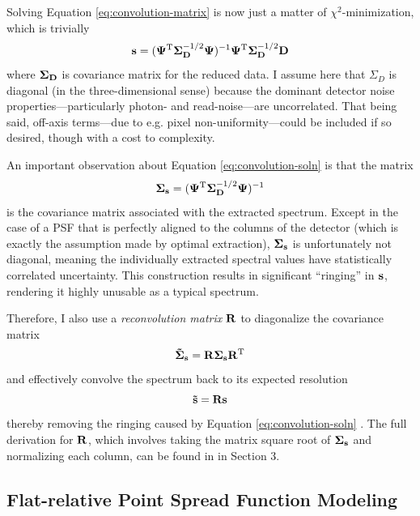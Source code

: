 Solving Equation \ref{eq:convolution-matrix} is now just a matter of $\chi^2$-minimization, which is trivially
\begin{equation}
    \vb{s} = (\vb{\Psi}^\mathrm{T} \vb{\Sigma}_{\vb{D}}^{-1/2} \vb{\Psi})^{-1} \vb{\Psi}^\mathrm{T} \vb{\Sigma}_{\vb{D}}^{-1/2} \vb{D}
    \label{eq:convolution-soln}
\end{equation}
where $\vb{\Sigma_D}$ is covariance matrix for the reduced data. I assume here that $\Sigma_D$ is diagonal (in the three-dimensional sense) because the dominant detector noise properties---particularly photon- and read-noise---are uncorrelated. That being said, off-axis terms---due to e.g. pixel non-uniformity---could be included if so desired, though with a cost to complexity.

An important observation about Equation \ref{eq:convolution-soln} is that the matrix
\begin{equation}
    \vb{\Sigma_s} = (\vb{\Psi}^\mathrm{T} \vb{\Sigma}_{\vb{D}}^{-1/2} \vb{\Psi})^{-1}
\end{equation}
is the covariance matrix associated with the extracted spectrum. Except in the case of a PSF that is perfectly aligned to the columns of the detector (which is exactly the assumption made by optimal extraction), $\vb{\Sigma_s}$ is unfortunately not diagonal, meaning the individually extracted spectral values have statistically correlated uncertainty. This construction results in significant ``ringing'' in $\vb{s}$, rendering it highly unusable as a typical spectrum.

Therefore, I also use a \textit{reconvolution matrix} $\vb{R}$ to diagonalize the covariance matrix
\begin{equation}
    \vb{\Tilde{\Sigma}_s} = \vb{R} \vb{\Sigma_s} \vb{R}^\mathrm{T}
\end{equation}
and effectively convolve the spectrum back to its expected resolution
\begin{equation}
    \vb{\Tilde{s}} = \vb{R} \vb{s}
\end{equation}
thereby removing the ringing caused by Equation \ref{eq:convolution-soln} \citep{bolton_spectro-perfectionism_2009}. The full derivation for $\vb{R}$, which involves taking the matrix square root of $\vb{\Sigma_s}$ and normalizing each column, can be found in \citet{bolton_spectro-perfectionism_2009} in Section 3.

\subsection{Flat-relative Point Spread Function Modeling} \label{pipeline2:spec-perf:psf}

